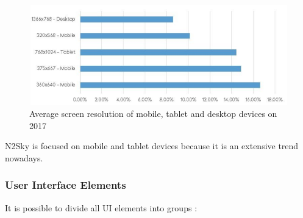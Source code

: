\begin{figure}[H]
\begin{center}
  \includegraphics[scale=0.65]{components/3/components/screen.png}
  \caption{Average screen resolution of mobile, tablet and desktop devices on 2017}
  \label{fig:screen}
\end{center}
\end{figure}

N2Sky is focused on mobile and tablet devices because it is an extensive trend nowadays. 

\subsubsection{User Interface Elements}\label{User Interface Elements}

It is possible to divide all UI elements into groups \cite{intelligent_support}:

